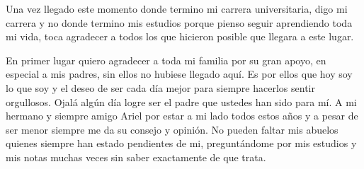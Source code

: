 \begin{acknowledgements}

Una vez llegado este momento donde termino mi carrera universitaria, digo mi carrera y no donde termino mis estudios porque pienso seguir aprendiendo toda mi vida, toca agradecer a todos los que hicieron posible que llegara a este lugar.

En primer lugar quiero agradecer a toda mi familia por su gran apoyo, en especial a mis padres, sin ellos no hubiese llegado aqu\'i. Es por ellos que hoy soy lo que soy y el deseo de ser cada d\'ia mejor para siempre hacerlos sentir orgullosos. Ojal\'a alg\'un d\'ia logre ser el padre que ustedes han sido para m\'i. A mi hermano y siempre amigo Ariel por estar a mi lado todos estos a\~nos y a pesar de ser menor siempre me da su consejo y opini\'on. No pueden faltar mis abuelos quienes siempre han estado pendientes de mi, pregunt\'andome por mis estudios y mis notas muchas veces sin saber exactamente de que trata.

\end{acknowledgements}
